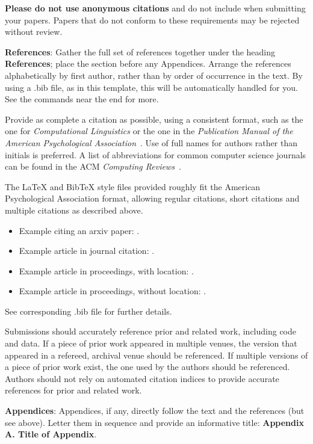 \documentclass[11pt,a4paper]{article}
\begin{document}
\textbf{Please do not use anonymous citations} and do not include
 when submitting your papers. Papers that do not
conform to these requirements may be rejected without review.

\textbf{References}: Gather the full set of references together under
the heading {\bf References}; place the section before any Appendices. 
Arrange the references alphabetically
by first author, rather than by order of occurrence in the text.
By using a .bib file, as in this template, this will be automatically 
handled for you. See the \verb|| commands near the end for more.

Provide as complete a citation as possible, using a consistent format,
such as the one for {\em Computational Linguistics\/} or the one in the 
{\em Publication Manual of the American 
Psychological Association\/}~\cite{APA:83}. Use of full names for
authors rather than initials is preferred. A list of abbreviations
for common computer science journals can be found in the ACM 
{\em Computing Reviews\/}~\cite{ACM:83}.

The \LaTeX{} and Bib\TeX{} style files provided roughly fit the
American Psychological Association format, allowing regular citations, 
short citations and multiple citations as described above.  

\begin{itemize}
\item Example citing an arxiv paper: \cite{rasooli-tetrault-2015}. 
\item Example article in journal citation: \cite{Ando2005}.
\item Example article in proceedings, with location: \cite{borsch2011}.
\item Example article in proceedings, without location: \cite{andrew2007scalable}.
\end{itemize}
See corresponding .bib file for further details.

Submissions should accurately reference prior and related work, including code and data. If a piece of prior work appeared in multiple venues, the version that appeared in a refereed, archival venue should be referenced. If multiple versions of a piece of prior work exist, the one used by the authors should be referenced. Authors should not rely on automated citation indices to provide accurate references for prior and related work.

{\bf Appendices}: Appendices, if any, directly follow the text and the
references (but see above).  Letter them in sequence and provide an
informative title: {\bf Appendix A. Title of Appendix}.
\end{document}
